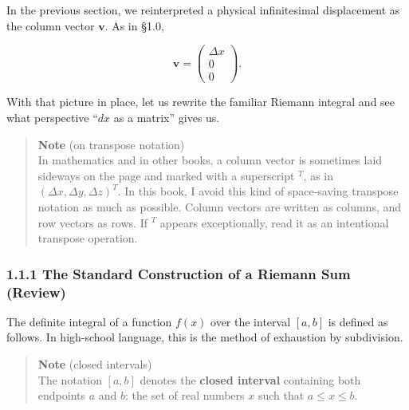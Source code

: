 \documentclass[a4paper,12pt,openany]{book}
\begin{document}
In the previous section, we reinterpreted a physical infinitesimal
displacement as the column vector \(\mathbf{v}\). As in §1.0,

\[
\mathbf{v} = \begin{pmatrix} \Delta x \\ 0 \\ 0 \end{pmatrix}.
\]

With that picture in place, let us rewrite the familiar Riemann integral
and see what perspective ``\(dx\) as a matrix'' gives us.

\begin{quote}
\textbf{Note} (on transpose notation)\\
In mathematics and in other books, a column vector is sometimes laid
sideways on the page and marked with a superscript \({}^T\), as in
\((\Delta x,\Delta y,\Delta z)^T\). In this book, I avoid this kind of
space-saving transpose notation as much as possible. Column vectors are
written as columns, and row vectors as rows. If \({}^T\) appears
exceptionally, read it as an intentional transpose operation.
\end{quote}

\hypertarget{the-standard-construction-of-a-riemann-sum-review}{%
\subsubsection{1.1.1 The Standard Construction of a Riemann Sum
(Review)}\label{the-standard-construction-of-a-riemann-sum-review}}

The definite integral of a function \(f(x)\) over the interval \([a,b]\)
is defined as follows. In high-school language, this is the method of
exhaustion by subdivision.

\begin{quote}
\textbf{Note} (closed intervals)\\
The notation \([a,b]\) denotes the \textbf{closed interval} containing
both endpoints \(a\) and \(b\): the set of real numbers \(x\) such that
\(a \le x \le b\).
\end{quote}
\end{document}
